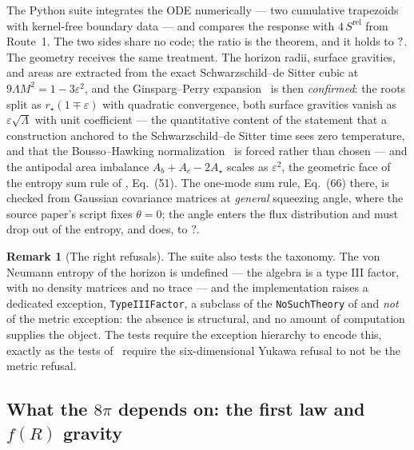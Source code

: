 \documentclass[11pt,a4paper]{article}
\newcommand{\NFOneModeDev}{?}\newcommand{\NFRGridMax}{?}
\newcommand{\Srel}{S^{\mathrm{rel}}}
\theoremstyle{plain}
\theoremstyle{definition}
\newtheorem{remark}{Remark}
\begin{document}
The Python suite integrates the ODE numerically --- two cumulative trapezoids with kernel-free boundary data ---
and compares the response with $4\,\Srel$ from Route~1. The two sides share
no code; the ratio is the theorem, and it holds to $?$.
The geometry receives the same treatment. The horizon radii, surface
gravities, and areas are extracted from the exact Schwarzschild--de Sitter
cubic at $9\Lambda M^2 = 1 - 3\varepsilon^2$, and the Ginsparg--Perry
expansion~\cite{GinspargPerry} is then \emph{confirmed}: the roots split as
$r_\star(1 \mp \varepsilon)$ with quadratic convergence, both surface
gravities vanish as $\varepsilon\sqrt{\Lambda}$ with unit coefficient ---
the quantitative content of the statement that a construction anchored to
the Schwarzschild--de Sitter time sees zero temperature, and that the
Bousso--Hawking normalization~\cite{BoussoHawking} is forced rather than
chosen --- and the antipodal area imbalance $A_b + A_c - 2A_\star$ scales as
$\varepsilon^2$, the geometric face of the entropy sum rule of
\cite{NariaiI}, Eq.~(51). The one-mode sum rule, Eq.~(66) there, is checked
from Gaussian covariance matrices at \emph{general} squeezing angle, where
the source paper's script fixes $\theta = 0$; the angle enters the flux
distribution and must drop out of the entropy, and does, to
$\NFOneModeDev$.

\begin{remark}[The right refusals]
The suite also tests the taxonomy. The von Neumann entropy of the horizon is
undefined --- the algebra is a type III factor, with no density matrices and
no trace --- and the implementation raises a dedicated exception,
\texttt{TypeIIIFactor}, a subclass of the \texttt{NoSuchTheory} of
\cite{SuppStrings} and \emph{not} of the metric exception: the absence is
structural, and no amount of computation supplies the object. The tests
require the exception hierarchy to encode this, exactly as the tests
of~\cite{SuppStrings} require the six-dimensional Yukawa refusal to not be
the metric refusal.
\end{remark}

\subsection{What the $8\pi$ depends on: the first law and $f(R)$ gravity}
\label{sec:frlaw}
\end{document}
